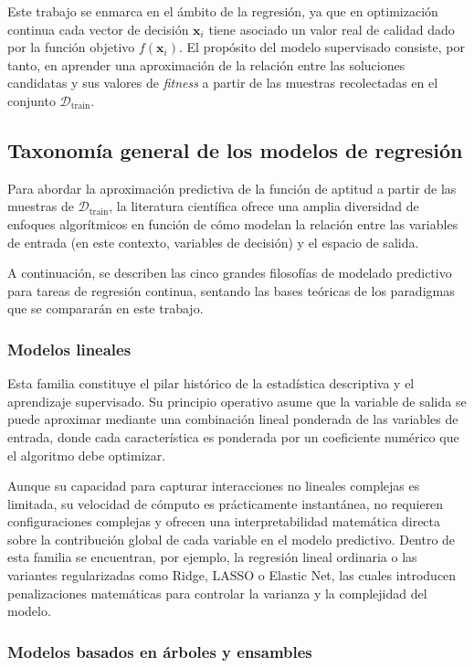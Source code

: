 Este trabajo se enmarca en el ámbito de la regresión, ya que en optimización continua cada vector de decisión \(\mathbf{x}_i\) tiene asociado un valor real de calidad dado por la función objetivo \(f(\mathbf{x}_i)\). El propósito del modelo supervisado consiste, por tanto, en aprender una aproximación de la relación entre las soluciones candidatas y sus valores de \textit{fitness} a partir de las muestras recolectadas en el conjunto \(\mathcal{D}_{\text{train}}\).

\subsection{Taxonomía general de los modelos de regresión}

Para abordar la aproximación predictiva de la función de aptitud a partir de las muestras de $\mathcal{D}_{\text{train}}$, la literatura científica ofrece una amplia diversidad de enfoques algorítmicos en función de cómo modelan la relación entre las variables de entrada (en este contexto, variables de decisión) y el espacio de salida.

A continuación, se describen las cinco grandes filosofías de modelado predictivo para tareas de regresión continua, sentando las bases teóricas de los paradigmas que se compararán en este trabajo.

\subsubsection{Modelos lineales}

Esta familia constituye el pilar histórico de la estadística descriptiva y el aprendizaje supervisado. Su principio operativo asume que la variable de salida se puede aproximar mediante una combinación lineal ponderada de las variables de entrada, donde cada característica es ponderada por un coeficiente numérico que el algoritmo debe optimizar.

Aunque su capacidad para capturar interacciones no lineales complejas es limitada, su velocidad de cómputo es prácticamente instantánea, no requieren configuraciones complejas y ofrecen una interpretabilidad matemática directa sobre la contribución global de cada variable en el modelo predictivo. Dentro de esta familia se encuentran, por ejemplo, la regresión lineal ordinaria o las variantes regularizadas como Ridge, LASSO o Elastic Net, las cuales introducen penalizaciones matemáticas para controlar la varianza y la complejidad del modelo.

\subsubsection{Modelos basados en árboles y ensambles}

